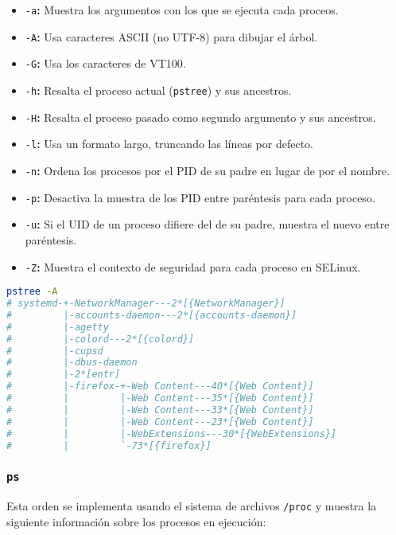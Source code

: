 \begin{itemize}
	\item\texttt{-a}\textbf{:} Muestra los argumentos con los que se ejecuta cada proceos.
	\item\texttt{-A}\textbf{:} Usa caracteres ASCII (no UTF-8) para dibujar el árbol.
	\item\texttt{-G}\textbf{:} Usa los caracteres de VT100.
	\item\texttt{-h}\textbf{:} Resalta el proceso actual (\texttt{pstree}) y sus ancestros.
	\item\texttt{-H}\textbf{:} Resalta el proceso pasado como segundo argumento y sus ancestros.
	\item\texttt{-l}\textbf{:} Usa un formato largo, truncando las líneas por defecto.
	\item\texttt{-n}\textbf{:} Ordena los procesos por el PID de su padre en lugar de por el nombre.
	\item\texttt{-p}\textbf{:} Desactiva la muestra de los PID entre paréntesis para cada proceso.
	\item\texttt{-u}\textbf{:} Si el UID de un proceso difiere del de su padre, muestra el nuevo entre paréntesis.
	\item\texttt{-Z}\textbf{:} Muestra el contexto de seguridad para cada proceso en SELinux.
\end{itemize}

\begin{lstlisting}[language=Bash]
pstree -A
# systemd-+-NetworkManager---2*[{NetworkManager}]
#         |-accounts-daemon---2*[{accounts-daemon}]
#         |-agetty
#         |-colord---2*[{colord}]
#         |-cupsd
#         |-dbus-daemon
#         |-2*[entr]
#         |-firefox-+-Web Content---40*[{Web Content}]
#         |         |-Web Content---35*[{Web Content}]
#         |         |-Web Content---33*[{Web Content}]
#         |         |-Web Content---23*[{Web Content}]
#         |         |-WebExtensions---30*[{WebExtensions}]
#         |         `-73*[{firefox}]
\end{lstlisting}

\subsubsection{\texttt{ps}}

Esta orden se implementa usando el sistema de archivos \texttt{/proc} y muestra la siguiente información sobre los procesos en ejecución:

